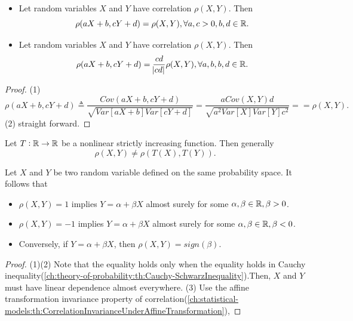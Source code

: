 \begin{refsection}
\begin{lemma}\label{ch:statistical-models:th:CorrelationInvarianceUnderAffineTransformation}\hfill
\begin{itemize}
	\item Let random variables $X$ and $Y$ have correlation $\rho(X,Y)$. Then
	$$\rho(aX+b, cY + d) = \rho(X,Y), \forall a,c >0, b,d\in \mathbb{R}.$$
	\item Let random variables $X$ and $Y$ have correlation $\rho(X,Y)$. Then
	$$\rho(aX+b, cY + d) = \frac{cd}{\abs{cd}}\rho(X,Y), \forall a,b, b,d\in \mathbb{R}.$$
\end{itemize}	
	
\end{lemma}
\begin{proof}
(1)	
$$\rho(aX+b, cY + d) \triangleq  \frac{Cov(aX + b,cY + d)}{\sqrt{Var[aX+b]Var[cY+d]}} = \frac{aCov(X,Y)d}{\sqrt{a^2Var[X]Var[Y]c^2}} = = \rho(X,Y). $$	
(2) straight forward.
\end{proof}

\begin{remark}
Let $T:\mathbb{R} \to \mathbb{R}$ be a nonlinear strictly increasing function. Then generally $$\rho(X,Y) \neq \rho(T(X), T(Y)).$$	
\end{remark}


\begin{lemma}\label{ch:statistical-models:th:PerfectLinearCorrelationAndLinearFunctionRelationship}\cite[202]{mcneil2015quantitative} Let $X$ and $Y$ be two random variable defined on the same probability space.  It follows that
\begin{itemize}
	\item $\rho(X,Y) = 1$ implies $Y = \alpha  + \beta X$ almost surely for some $\alpha,\beta \in \mathbb{R}, \beta >0$.
	\item $\rho(X,Y) = -1$ implies $Y = \alpha  + \beta X$ almost surely for some $\alpha,\beta \in \mathbb{R}, \beta <0$.
	\item Conversely, if $Y = \alpha + \beta X$, then $\rho(X,Y) = sign(\beta)$.
\end{itemize}	
\end{lemma}
\begin{proof}
(1)(2) Note that the equality holds only when the equality holds in Cauchy inequality(\autoref{ch:theory-of-probability:th:Cauchy-SchwarzInequality}).Then, $X$ and $Y$ must have linear dependence almost everywhere. 
(3)  Use the affine transformation invariance property of correlation(\autoref{ch:statistical-models:th:CorrelationInvarianceUnderAffineTransformation}),
\end{proof}


\end{refsection}

